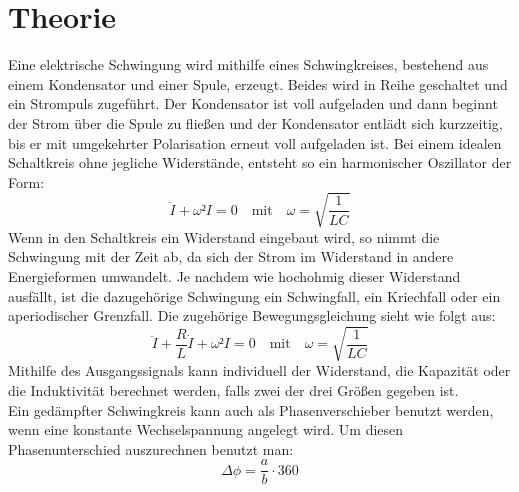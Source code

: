 \section{Theorie}
\label{sec:Theorie}

Eine elektrische Schwingung wird mithilfe eines Schwingkreises, bestehend aus einem Kondensator und einer Spule, erzeugt.
Beides wird in Reihe geschaltet und ein Strompuls zugeführt.
Der Kondensator ist voll aufgeladen und dann beginnt der Strom über die Spule zu fließen und der Kondensator entlädt sich kurzzeitig, bis er mit umgekehrter Polarisation erneut voll aufgeladen ist.
Bei einem idealen Schaltkreis ohne jegliche Widerstände, entsteht so ein harmonischer Oszillator der Form:
\begin{equation}
    \ddot{I} + \omega² I = 0 \quad\textrm{mit}\quad \omega = \sqrt{\frac{1}{LC}}
    \label{eq:harmossi}
\end{equation}
Wenn in den Schaltkreis ein Widerstand eingebaut wird, so nimmt die Schwingung mit der Zeit ab, da sich der Strom im Widerstand in andere Energieformen umwandelt.
Je nachdem wie hochohmig dieser Widerstand ausfällt, ist die dazugehörige Schwingung ein Schwingfall, ein Kriechfall oder ein aperiodischer Grenzfall.
Die zugehörige Bewegungsgleichung sieht wie folgt aus:
\begin{equation}
    \ddot{I} + \frac{R}{L}\dot{I} + \omega² I = 0 \quad\textrm{mit}\quad \omega = \sqrt{\frac{1}{LC}}
    \label{eq:dampfossi}
\end{equation}
Mithilfe des Ausgangssignals kann individuell der Widerstand, die Kapazität oder die Induktivität berechnet werden, falls zwei der drei Größen gegeben ist.
\\
Ein gedämpfter Schwingkreis kann auch als Phasenverschieber benutzt werden, wenn eine konstante Wechselspannung angelegt wird.
Um diesen Phasenunterschied auszurechnen benutzt man:
\begin{equation}
    \Delta\phi = \frac{a}{b}\cdot360
    \label{eq:phase}
\end{equation}